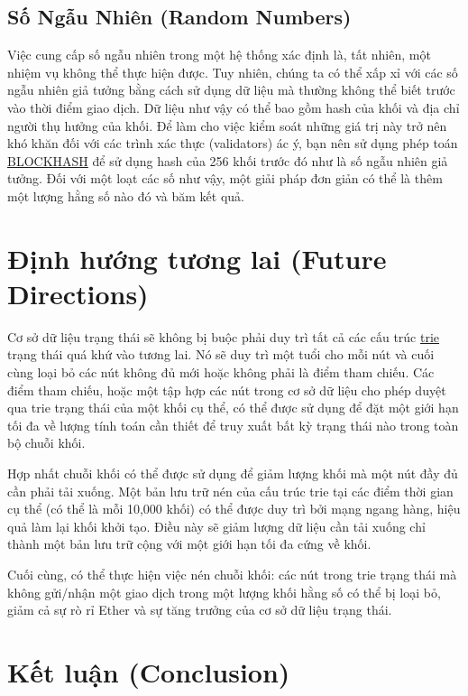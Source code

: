 \documentclass[9pt,oneside]{amsart}
\begin{document}
\begin{multicols}{2}
\subsection{Số Ngẫu Nhiên (Random Numbers)}
Việc cung cấp số ngẫu nhiên trong một hệ thống xác định là, tất nhiên, một nhiệm vụ không thể thực hiện được. Tuy nhiên, chúng ta có thể xấp xỉ với các số ngẫu nhiên giả tưởng bằng cách sử dụng dữ liệu mà thường không thể biết trước vào thời điểm giao dịch. Dữ liệu như vậy có thể bao gồm hash của khối và địa chỉ người thụ hưởng của khối. Để làm cho việc kiểm soát những giá trị này trở nên khó khăn đối với các trình xác thực (validators) ác ý, bạn nên sử dụng phép toán {\small \hyperlink{blockhash}{BLOCKHASH}} để sử dụng hash của 256 khối trước đó như là số ngẫu nhiên giả tưởng. Đối với một loạt các số như vậy, một giải pháp đơn giản có thể là thêm một lượng hằng số nào đó và băm kết quả.

\section{Định hướng tương lai (Future Directions)} \label{ch:future}

Cơ sở dữ liệu trạng thái sẽ không bị buộc phải duy trì tất cả các cấu trúc \hyperlink{trie}{trie} trạng thái quá khứ vào tương lai. Nó sẽ duy trì một tuổi cho mỗi nút và cuối cùng loại bỏ các nút không đủ mới hoặc không phải là điểm tham chiếu. Các điểm tham chiếu, hoặc một tập hợp các nút trong cơ sở dữ liệu cho phép duyệt qua trie trạng thái của một khối cụ thể, có thể được sử dụng để đặt một giới hạn tối đa về lượng tính toán cần thiết để truy xuất bất kỳ trạng thái nào trong toàn bộ chuỗi khối.

Hợp nhất chuỗi khối có thể được sử dụng để giảm lượng khối mà một nút đầy đủ cần phải tải xuống. Một bản lưu trữ nén của cấu trúc trie tại các điểm thời gian cụ thể (có thể là mỗi 10,000 khối) có thể được duy trì bởi mạng ngang hàng, hiệu quả làm lại khối khởi tạo. Điều này sẽ giảm lượng dữ liệu cần tải xuống chỉ thành một bản lưu trữ cộng với một giới hạn tối đa cứng về khối.

Cuối cùng, có thể thực hiện việc nén chuỗi khối: các nút trong trie trạng thái mà không gửi/nhận một giao dịch trong một lượng khối hằng số có thể bị loại bỏ, giảm cả sự rò rỉ Ether và sự tăng trưởng của cơ sở dữ liệu trạng thái.

\section{Kết luận (Conclusion)} \label{ch:conclusion}


\end{multicols}
\end{document}
